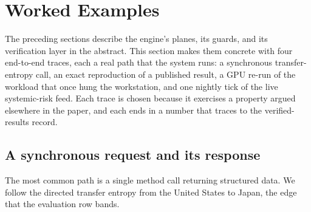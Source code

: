 \section{Worked Examples}
\label{sec:worked}

The preceding sections describe the engine's planes, its guards, and its
verification layer in the abstract. This section makes them concrete with four
end-to-end traces, each a real path that the system runs: a synchronous
transfer-entropy call, an exact reproduction of a published result, a GPU re-run
of the workload that once hung the workstation, and one nightly tick of the
live systemic-risk feed. Each trace is chosen because it exercises a property
argued elsewhere in the paper, and each ends in a number that traces to the
verified-results record.

\subsection{A synchronous request and its response}
\label{sec:worked-sync}

The most common path is a single method call returning structured data. We
follow the directed transfer entropy from the United States to Japan, the edge
that the  evaluation row bands.

